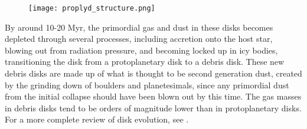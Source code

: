 %
%




\begin{figure}[htp]
  \hspace*{\fill}%
  \texttt{[image: proplyd\_structure.png]}\hfill%
  \hspace*{\fill}%
  \label{fig:proplyd_str}
\end{figure}



By around 10-20 Myr, the primordial gas and dust in these disks becomes depleted through several processes, including accretion onto the host star, blowing out from radiation pressure, and becoming locked up in icy bodies, transitioning the disk from a protoplanetary disk to a debris disk. These new debris disks are made up of what is thought to be second generation dust, created by the grinding down of boulders and planetesimals, since any primordial dust from the initial collapse should have been blown out by this time. The gas masses in debris disks tend to be orders of magnitude lower than in protoplanetary disks. For a more complete review of disk evolution, see \citet{Hughes2018}.




